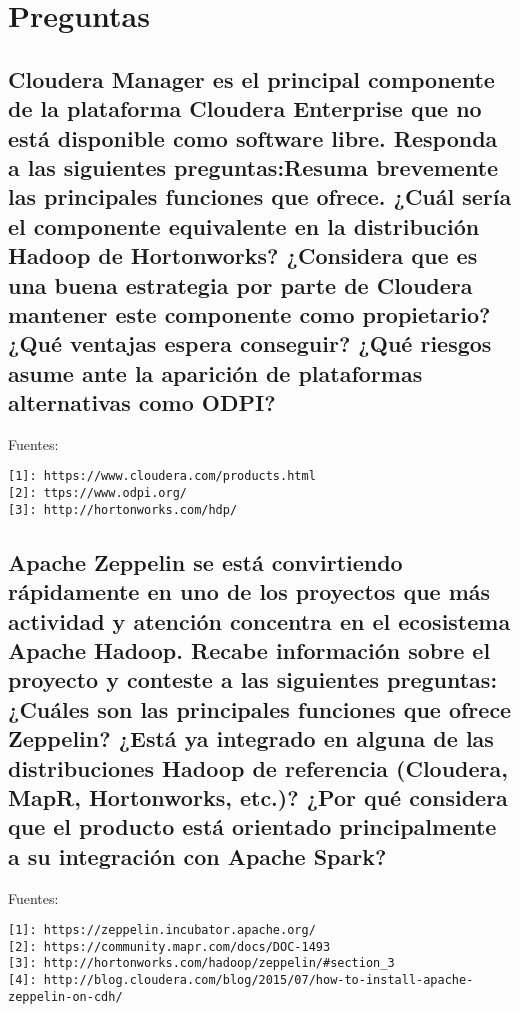 \documentclass[12pt,a4paper,twoside,openright,titlepage,final]{article}
\author{José Ignacio Escribano}
\title{}
\begin{document}
\setcounter{page}{1}


\tableofcontents
\thispagestyle{empty}
\newpage

\setcounter{page}{1}


\section{Preguntas}

\subsection{Cloudera Manager es el principal componente de la plataforma Cloudera Enterprise que no está disponible como software libre. Responda a las siguientes preguntas:Resuma brevemente las principales funciones que ofrece. ¿Cuál sería el componente equivalente en la distribución Hadoop de Hortonworks? ¿Considera que es una buena estrategia por parte de Cloudera mantener este componente como propietario? ¿Qué ventajas espera conseguir? ¿Qué riesgos asume ante la aparición de plataformas alternativas como ODPI?}

Fuentes:\\
\begin{verbatim}
[1]: https://www.cloudera.com/products.html
[2]: ttps://www.odpi.org/
[3]: http://hortonworks.com/hdp/
\end{verbatim}

\subsection{Apache Zeppelin se está convirtiendo rápidamente en uno de los proyectos que más actividad y atención concentra en el ecosistema Apache Hadoop. Recabe información sobre el proyecto y conteste a las siguientes preguntas: ¿Cuáles son las principales funciones que ofrece Zeppelin? ¿Está ya integrado en alguna de las distribuciones Hadoop de referencia (Cloudera, MapR, Hortonworks, etc.)? ¿Por qué considera que el producto está orientado principalmente a su integración con Apache Spark?}

Fuentes:\\
\begin{verbatim}
[1]: https://zeppelin.incubator.apache.org/
[2]: https://community.mapr.com/docs/DOC-1493
[3]: http://hortonworks.com/hadoop/zeppelin/#section_3
[4]: http://blog.cloudera.com/blog/2015/07/how-to-install-apache-zeppelin-on-cdh/
\end{verbatim}
\end{document}
